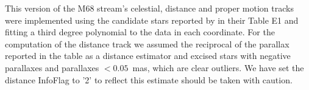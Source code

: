 This version of the M68 stream's celestial, distance and proper motion tracks were implemented using the candidate stars reported by \citet{Palau2019} in their Table E1 and fitting a third degree polynomial to the data in each coordinate. For the computation of the distance track we assumed the reciprocal of the parallax reported in the table as a distance estimator and excised stars with negative parallaxes and parallaxes $<0.05$~mas, which are clear outliers. We have set the distance InfoFlag to '2' to reflect this estimate should be taken with caution.
